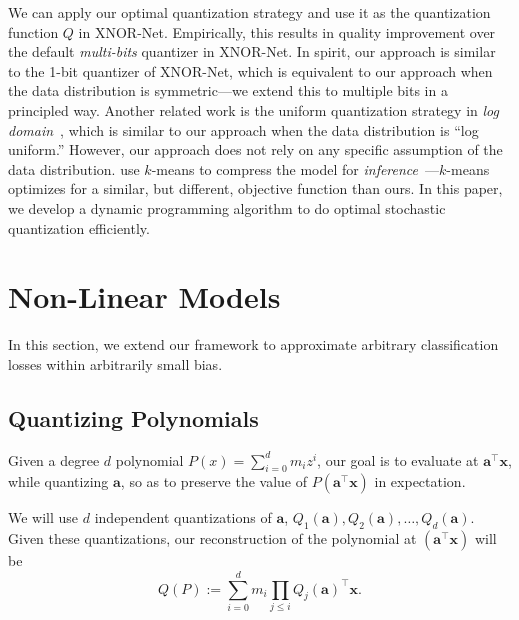 \documentclass{article}
\renewcommand{\vec}[1]{\mathbf{#1}}
\begin{document}
We can apply our optimal quantization strategy 
and use it as the quantization function $Q$
in XNOR-Net. Empirically, this results in 
quality improvement
over the default {\em multi-bits} quantizer in XNOR-Net. 
In spirit, our approach is similar to the 1-bit quantizer of
XNOR-Net, which is equivalent to our approach when the data
distribution is symmetric---we extend this
to multiple bits in a principled way. Another related work
is the uniform quantization strategy 
in {\em log domain}~\cite{miyashita2016convolutional},
which is similar to our approach when the data distribution
is ``log uniform.'' However, our approach does not rely on
any specific assumption of the data distribution.
\citet{Han:2016:ICLR} use $k$-means to
compress the model for {\em inference}~---$k$-means
optimizes for a similar, but different, objective
function than ours. In this paper, we 
develop a dynamic
programming algorithm to do optimal stochastic quantization efficiently.



\vspace{-1em}
\section{Non-Linear Models}
\vspace{-0.5em}

In this section, we extend our framework to approximate arbitrary classification losses within arbitrarily small bias. 

\vspace{-0.5em}
\subsection{Quantizing Polynomials} 
\vspace{-0.5em}

Given a degree $d$ polynomial $P(x) = \sum_{i = 0}^{d} m_i z^i$,
our goal is to evaluate at $\vec{a}^\top \vec{x}$, while quantizing $\vec{a}$, so as to preserve the value of $P( \vec{a}^\top \vec{x})$ in expectation. 

\vspace{-0.5em}
We will use $d$ independent quantizations of $\vec{a}$, $Q_1(\vec{a}), Q_2(\vec{a}), \ldots, Q_d(\vec{a})$. 
Given these quantizations, our reconstruction of the polynomial at $( \vec{a}^\top \vec{x})$ will be 
\vspace{-0.5em}
$$ Q(P) := \sum_{i = 0}^d m_i \prod_{j \leq i} Q_j(\vec{a})^\top \vec{x}.$$
\end{document}
